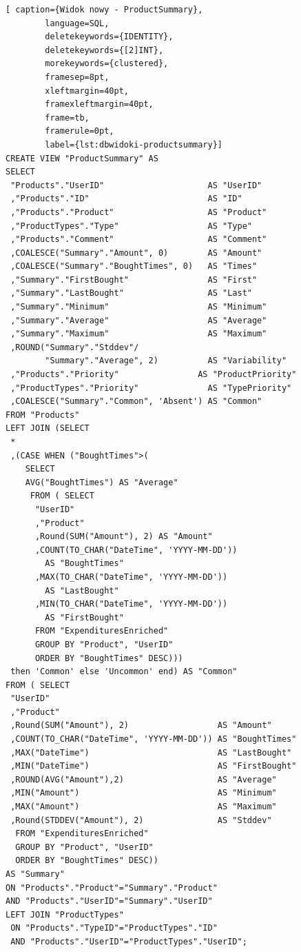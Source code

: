 \documentclass[a4paper, 10pt, twoside, openright]{report}
\begin{document}
\begin{large}
\begin{minipage}{\textwidth}
    \begin{lstlisting}[ caption={Widok nowy - ProductSummary},
        language=SQL,
        deletekeywords={IDENTITY},
        deletekeywords={[2]INT},
        morekeywords={clustered},
        framesep=8pt,
        xleftmargin=40pt,
        framexleftmargin=40pt,
        frame=tb,
        framerule=0pt,
        label={lst:dbwidoki-productsummary}]
CREATE VIEW "ProductSummary" AS
SELECT
 "Products"."UserID"                     AS "UserID"
 ,"Products"."ID"                        AS "ID"
 ,"Products"."Product"                   AS "Product"
 ,"ProductTypes"."Type"                  AS "Type"
 ,"Products"."Comment"                   AS "Comment"
 ,COALESCE("Summary"."Amount", 0)        AS "Amount"
 ,COALESCE("Summary"."BoughtTimes", 0)   AS "Times"
 ,"Summary"."FirstBought"                AS "First"
 ,"Summary"."LastBought"                 AS "Last"
 ,"Summary"."Minimum"                    AS "Minimum"
 ,"Summary"."Average"                    AS "Average"
 ,"Summary"."Maximum"                    AS "Maximum"
 ,ROUND("Summary"."Stddev"/
        "Summary"."Average", 2)          AS "Variability"
 ,"Products"."Priority"                AS "ProductPriority"
 ,"ProductTypes"."Priority"              AS "TypePriority"
 ,COALESCE("Summary"."Common", 'Absent') AS "Common"
FROM "Products"
LEFT JOIN (SELECT 
 *
 ,(CASE WHEN ("BoughtTimes">(
    SELECT 
    AVG("BoughtTimes") AS "Average" 
     FROM ( SELECT
      "UserID"
      ,"Product"
      ,Round(SUM("Amount"), 2) AS "Amount"
      ,COUNT(TO_CHAR("DateTime", 'YYYY-MM-DD'))
        AS "BoughtTimes"
      ,MAX(TO_CHAR("DateTime", 'YYYY-MM-DD'))
        AS "LastBought"
      ,MIN(TO_CHAR("DateTime", 'YYYY-MM-DD'))
        AS "FirstBought"
      FROM "ExpendituresEnriched"
      GROUP BY "Product", "UserID"
      ORDER BY "BoughtTimes" DESC))) 
 then 'Common' else 'Uncommon' end) AS "Common"
FROM ( SELECT
 "UserID"
 ,"Product"
 ,Round(SUM("Amount"), 2)                  AS "Amount"
 ,COUNT(TO_CHAR("DateTime", 'YYYY-MM-DD')) AS "BoughtTimes"
 ,MAX("DateTime")                          AS "LastBought"
 ,MIN("DateTime")                          AS "FirstBought"
 ,ROUND(AVG("Amount"),2)                   AS "Average"
 ,MIN("Amount")                            AS "Minimum"
 ,MAX("Amount")                            AS "Maximum"
 ,Round(STDDEV("Amount"), 2)               AS "Stddev"
  FROM "ExpendituresEnriched"
  GROUP BY "Product", "UserID"
  ORDER BY "BoughtTimes" DESC))
AS "Summary"
ON "Products"."Product"="Summary"."Product"
AND "Products"."UserID"="Summary"."UserID"
LEFT JOIN "ProductTypes" 
 ON "Products"."TypeID"="ProductTypes"."ID"
 AND "Products"."UserID"="ProductTypes"."UserID";\end{lstlisting}
\end{minipage}


\end{large}
\end{document}
